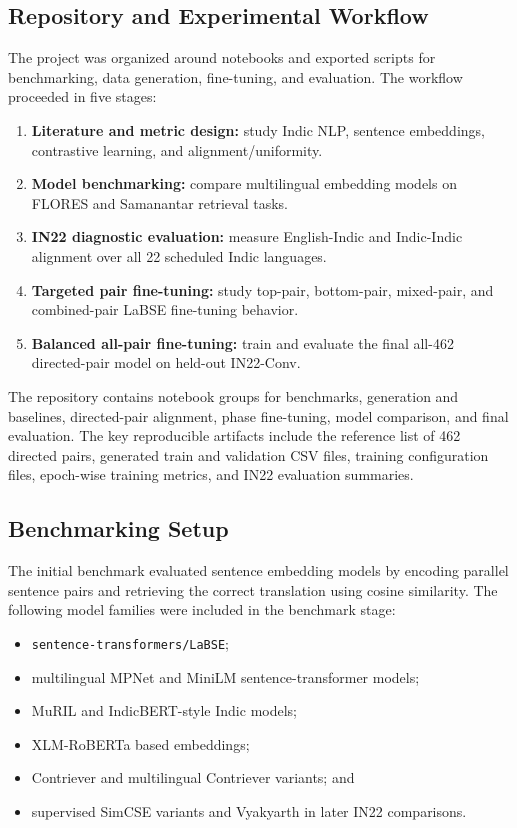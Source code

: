 \documentclass[12pt, a4paper]{article}
\begin{document}
\subsection{Repository and Experimental Workflow}

The project was organized around notebooks and exported scripts for benchmarking, data generation, fine-tuning, and evaluation. The workflow proceeded in five stages:

\begin{enumerate}[leftmargin=1.5cm, itemsep=4pt]
  \item \textbf{Literature and metric design:} study Indic NLP, sentence embeddings, contrastive learning, and alignment/uniformity.
  \item \textbf{Model benchmarking:} compare multilingual embedding models on FLORES and Samanantar retrieval tasks.
  \item \textbf{IN22 diagnostic evaluation:} measure English-Indic and Indic-Indic alignment over all 22 scheduled Indic languages.
  \item \textbf{Targeted pair fine-tuning:} study top-pair, bottom-pair, mixed-pair, and combined-pair LaBSE fine-tuning behavior.
  \item \textbf{Balanced all-pair fine-tuning:} train and evaluate the final all-462 directed-pair model on held-out IN22-Conv.
\end{enumerate}

The repository contains notebook groups for benchmarks, generation and baselines, directed-pair alignment, phase fine-tuning, model comparison, and final evaluation. The key reproducible artifacts include the reference list of 462 directed pairs, generated train and validation CSV files, training configuration files, epoch-wise training metrics, and IN22 evaluation summaries.

\subsection{Benchmarking Setup}

The initial benchmark evaluated sentence embedding models by encoding parallel sentence pairs and retrieving the correct translation using cosine similarity. The following model families were included in the benchmark stage:

\begin{itemize}[leftmargin=1.5cm, itemsep=4pt]
  \item \texttt{sentence-transformers/LaBSE};
  \item multilingual MPNet and MiniLM sentence-transformer models;
  \item MuRIL and IndicBERT-style Indic models;
  \item XLM-RoBERTa based embeddings;
  \item Contriever and multilingual Contriever variants; and
  \item supervised SimCSE variants and Vyakyarth in later IN22 comparisons.
\end{itemize}
\end{document}
